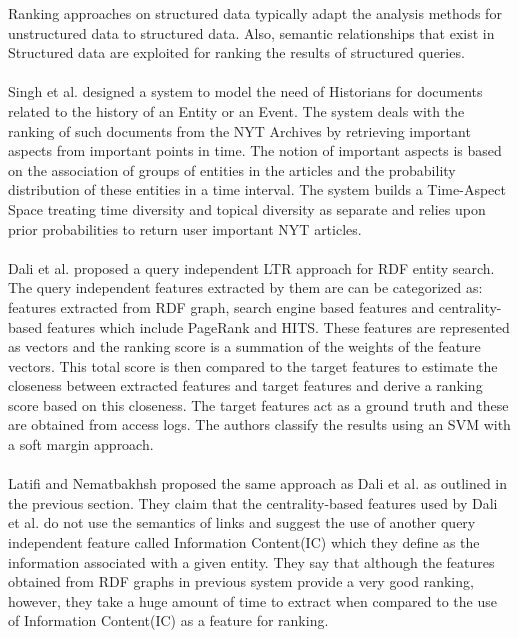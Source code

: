 \documentclass[runningheads,a4paper]{libtex/llncs}
\begin{document}
Ranking approaches on structured data typically adapt the analysis methods for unstructured data to structured data. Also, semantic relationships that exist in Structured data are exploited for ranking the results of structured queries.
\\\\
Singh et al.\cite{singh2016history} designed a system to model the need of Historians for documents related to the history of an Entity or an Event. The system deals with the ranking of such documents from the NYT Archives by retrieving important aspects from important points in time. The notion of important aspects is based on the association of groups of entities in the articles and the probability distribution of these entities in a time interval. The system builds a Time-Aspect Space treating time diversity and topical diversity as separate and relies upon prior probabilities to return user important NYT articles.
\\\\
Dali et al.\cite{dali2012query} proposed a query independent LTR approach for RDF entity search. The query independent features extracted by them are can be categorized as: features extracted from RDF graph, search engine based features and centrality-based features which include PageRank and HITS. These features are represented as vectors and the ranking score is a summation of the weights of the feature vectors. This total score is then compared to the target features to estimate the closeness between extracted features and target features and derive a ranking score based on this closeness. The target features act as a ground truth and these are obtained from access logs. The authors classify the results using an SVM with a soft margin approach.
\\\\
Latifi and Nematbakhsh \cite{latifi2014query} proposed the same approach as Dali et al.\cite{dali2012query} as outlined in the previous section. They claim that the centrality-based features used by Dali et al. do not use the semantics of links and suggest the use of another query independent feature called Information Content(IC) which they define as the information associated with a given entity. They say that although the features obtained from RDF graphs in previous system provide a very good ranking, however, they take a huge amount of time to extract when compared to the use of Information Content(IC) as a feature for ranking.
\\\\
\end{document}
